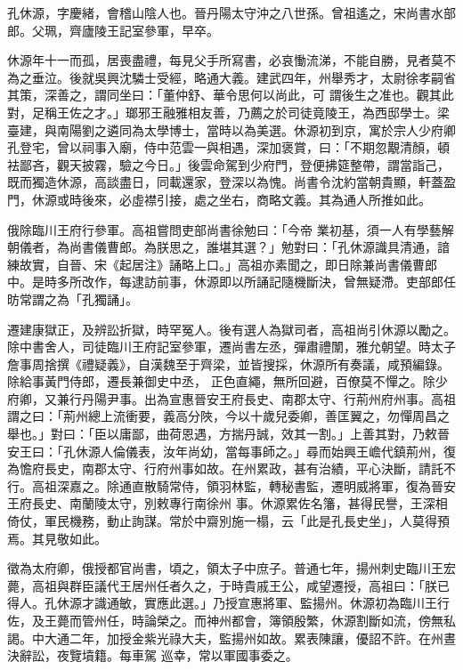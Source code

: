 
\begin{pinyinscope}

 孔休源，字慶緒，會稽山陰人也。晉丹陽太守沖之八世孫。曾祖遙之，宋尚書水部郎。父珮，齊廬陵王記室參軍，早卒。



 休源年十一而孤，居喪盡禮，每見父手所寫書，必哀慟流涕，不能自勝，見者莫不為之垂泣。後就吳興沈驎士受經，略通大義。建武四年，州舉秀才，太尉徐孝嗣省其策，深善之，謂同坐曰：「董仲舒、華令思何以尚此，可
 謂後生之准也。觀其此對，足稱王佐之才。」瑯邪王融雅相友善，乃薦之於司徒竟陵王，為西邸學士。梁臺建，與南陽劉之遴同為太學博士，當時以為美選。休源初到京，寓於宗人少府卿孔登宅，曾以祠事入廟，侍中范雲一與相遇，深加褒賞，曰：「不期忽覯清顏，頓袪鄙吝，觀天披霧，驗之今日。」後雲命駕到少府門，登便拂筵整帶，謂當詣己，既而獨造休源，高談盡日，同載還家，登深以為愧。尚書令沈約當朝貴顯，軒蓋盈門，休源或時後來，必虛襟引接，處之坐右，商略文義。其為通人所推如此。



 俄除臨川王府行參軍。高祖嘗問吏部尚書徐勉曰：「今帝
 業初基，須一人有學藝解朝儀者，為尚書儀曹郎。為朕思之，誰堪其選？」勉對曰：「孔休源識具清通，諳練故實，自晉、宋《起居注》誦略上口。」高祖亦素聞之，即日除兼尚書儀曹郎中。是時多所改作，每逮訪前事，休源即以所誦記隨機斷決，曾無疑滯。吏部郎任昉常謂之為「孔獨誦」。



 遷建康獄正，及辨訟折獄，時罕冤人。後有選人為獄司者，高祖尚引休源以勵之。除中書舍人，司徒臨川王府記室參軍，遷尚書左丞，彈肅禮闈，雅允朝望。時太子詹事周捨撰《禮疑義》，自漢魏至于齊梁，並皆搜採，休源所有奏議，咸預編錄。除給事黃門侍郎，遷長兼御史中丞，
 正色直繩，無所回避，百僚莫不憚之。除少府卿，又兼行丹陽尹事。出為宣惠晉安王府長史、南郡太守、行荊州府州事。高祖謂之曰：「荊州總上流衝要，義高分陜，今以十歲兒委卿，善匡翼之，勿憚周昌之舉也。」對曰：「臣以庸鄙，曲荷恩遇，方揣丹誠，效其一割。」上善其對，乃敕晉安王曰：「孔休源人倫儀表，汝年尚幼，當每事師之。」尋而始興王嶦代鎮荊州，復為憺府長史，南郡太守、行府州事如故。在州累政，甚有治績，平心決斷，請託不行。高祖深嘉之。除通直散騎常侍，領羽林監，轉秘書監，遷明威將軍，復為晉安王府長史、南蘭陵太守，別敕專行南徐州
 事。休源累佐名籓，甚得民譽，王深相倚仗，軍民機務，動止詢謀。常於中齋別施一榻，云「此是孔長史坐」，人莫得預焉。其見敬如此。



 徵為太府卿，俄授都官尚書，頃之，領太子中庶子。普通七年，揚州刺史臨川王宏薨，高祖與群臣議代王居州任者久之，于時貴戚王公，咸望遷授，高祖曰：「朕已得人。孔休源才識通敏，實應此選。」乃授宣惠將軍、監揚州。休源初為臨川王行佐，及王薨而管州任，時論榮之。而神州都會，簿領殷繁，休源割斷如流，傍無私謁。中大通二年，加授金紫光祿大夫，監揚州如故。累表陳讓，優詔不許。在州晝決辭訟，夜覽墳籍。每車駕
 巡幸，常以軍國事委之。




\end{pinyinscope}
